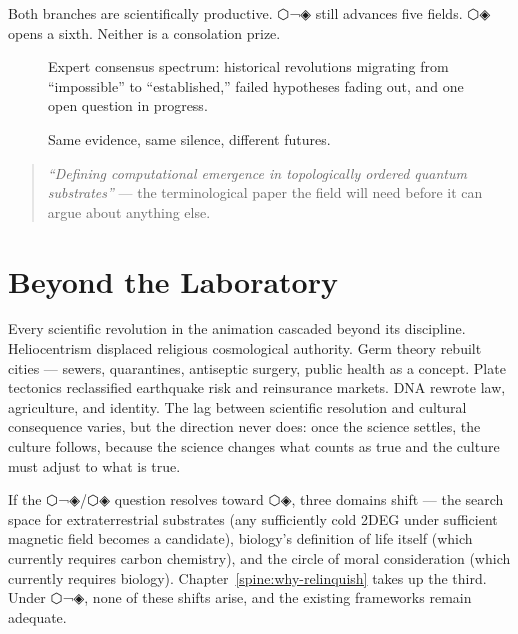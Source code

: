 Both branches are scientifically productive. ⬡¬◈ still advances five fields. ⬡◈ opens a sixth. Neither is a consolation prize.

\begin{figure}[ht]
\centering
\caption{Expert consensus spectrum: historical revolutions migrating from
``impossible'' to ``established,'' failed hypotheses fading out, and one
open question in progress.}
\label{fig:expert-spectrum}
\end{figure}

\begin{figure}[ht]
\centering
\caption{Same evidence, same silence, different futures.}
\label{fig:consequence-fork}
\end{figure}

\begin{quote}\small
\textit{``Defining computational emergence in topologically ordered quantum substrates''} --- the terminological paper the field will need before it can argue about anything else.
\end{quote}

\section*{Beyond the Laboratory}
\label{spine:sr-beyond-science}

Every scientific revolution in the animation cascaded beyond its discipline. Heliocentrism displaced religious cosmological authority. Germ theory rebuilt cities --- sewers, quarantines, antiseptic surgery, public health as a concept. Plate tectonics reclassified earthquake risk and reinsurance markets. DNA rewrote law, agriculture, and identity. The lag between scientific resolution and cultural consequence varies, but the direction never does: once the science settles, the culture follows, because the science changes what counts as true and the culture must adjust to what is true.

If the ⬡¬◈/⬡◈ question resolves toward ⬡◈, three domains shift --- the search space for extraterrestrial substrates (any sufficiently cold 2DEG under sufficient magnetic field becomes a candidate), biology's definition of life itself (which currently requires carbon chemistry), and the circle of moral consideration (which currently requires biology). Chapter~\ref{spine:why-relinquish} takes up the third. Under ⬡¬◈, none of these shifts arise, and the existing frameworks remain adequate.

